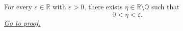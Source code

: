 \begin{lemma}
\label{lem:small-irrational-positive-number}
For every $\varepsilon\in\mathbb{R}$ with $\varepsilon>0$, there exists
$\eta\in\mathbb{R}\setminus\mathbb{Q}$ such that
\[
  0<\eta<\varepsilon.
\]
\hyperref[prf:small-irrational-positive-number]{\textit{Go to proof.}}
\end{lemma}